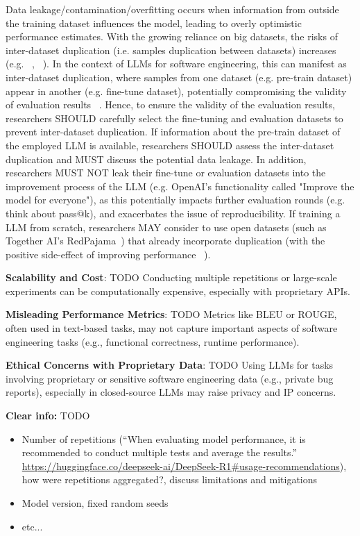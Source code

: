 Data leakage/contamination/overfitting occurs when information from outside the training dataset influences the model, leading to overly optimistic performance estimates. With the growing reliance on big datasets, the risks of inter-dataset duplication (i.e. samples duplication between datasets) increases (e.g. ~\cite{10.1145/3133908}, ~\cite{10.1145/3359591.3359735}). 
In the context of LLMs for software engineering, this can manifest as inter-dataset duplication, where samples from one dataset (e.g. pre-train dataset) appear in another (e.g. fine-tune dataset), potentially compromising the validity of evaluation results ~\cite{inter-dataset-lopez2025}. 
Hence, to ensure the validity of the evaluation results, researchers SHOULD carefully select the fine-tuning and evaluation datasets to prevent inter-dataset duplication. If information about the pre-train dataset of the employed LLM is available, researchers SHOULD assess the inter-dataset duplication and MUST discuss the potential data leakage.
In addition, researchers MUST NOT leak their fine-tune or evaluation datasets into the improvement process of the LLM (e.g. OpenAI's functionality called "Improve the model for everyone"), as this potentially impacts further evaluation rounds (e.g. think about pass@k), and exacerbates the issue of reproducibility.
If training a LLM from scratch, researchers MAY consider to use open datasets (such as Together AI's RedPajama~\cite{together2023redpajama}) that already incorporate duplication (with the positive side-effect of improving performance ~\cite{lee-etal-2022-deduplicating}).

\textbf{Scalability and Cost}: TODO
Conducting multiple repetitions or large-scale experiments can be computationally expensive, especially with proprietary APIs.

\textbf{Misleading Performance Metrics}: TODO
Metrics like BLEU or ROUGE, often used in text-based tasks, may not capture important aspects of software engineering tasks (e.g., functional correctness, runtime performance).

\textbf{Ethical Concerns with Proprietary Data}: TODO
Using LLMs for tasks involving proprietary or sensitive software engineering data (e.g., private bug reports), especially in closed-source LLMs may raise privacy and IP concerns.

\textbf{Clear info:} TODO
\begin{itemize}
  \item Number of repetitions (``When evaluating model performance, it is recommended to conduct multiple tests and average the results.'' \url{https://huggingface.co/deepseek-ai/DeepSeek-R1\#usage-recommendations}), how were repetitions aggregated?, discuss limitations and mitigations
  \item Model version, fixed random seeds
  \item etc...
\end{itemize}

